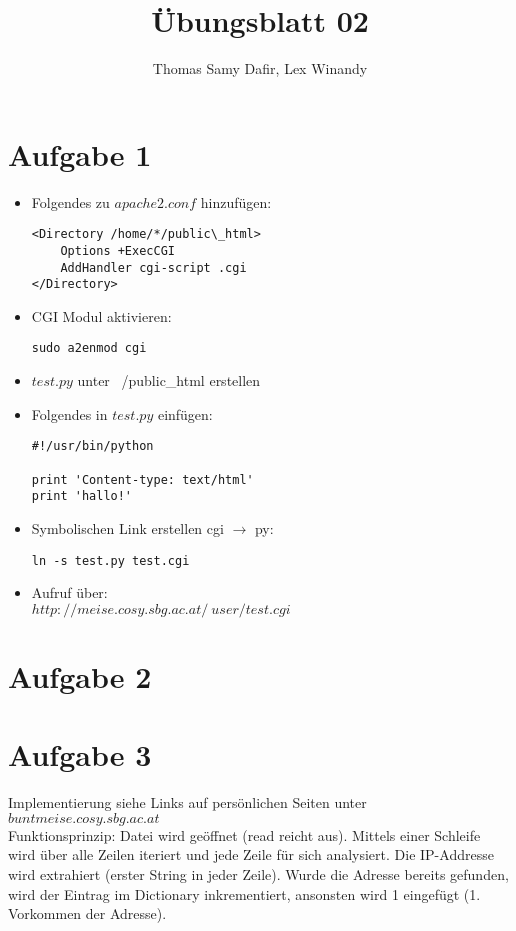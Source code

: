 \documentclass[12pt, a4paper]{report}
\title{Übungsblatt 02}
\author{Thomas Samy Dafir, Lex Winandy}
\date{}
\begin{document}
\maketitle

\section*{Aufgabe 1}
\begin{itemize}

\item Folgendes zu $apache2.conf$ hinzufügen:
\begin{verbatim}
<Directory /home/*/public\_html>
	Options +ExecCGI
	AddHandler cgi-script .cgi
</Directory>
\end{verbatim}
\item CGI Modul aktivieren:
\begin{verbatim}
sudo a2enmod cgi
\end{verbatim}

\item $test.py$ unter ~/public\_html erstellen\\

\item Folgendes in $test.py$ einfügen:
\begin{verbatim}
#!/usr/bin/python

print 'Content-type: text/html'
print 'hallo!'
\end{verbatim}

\item Symbolischen Link erstellen cgi $\rightarrow$ py:
\begin{verbatim}
ln -s test.py test.cgi
\end{verbatim}

\item Aufruf über:\\ $http://meise.cosy.sbg.ac.at/~user/test.cgi$
\end{itemize}


\section*{Aufgabe 2}

\section*{Aufgabe 3}

Implementierung siehe Links auf persönlichen Seiten unter $buntmeise.cosy.sbg.ac.at$\\
Funktionsprinzip: Datei wird geöffnet (read reicht aus). Mittels einer Schleife wird über alle Zeilen iteriert und jede Zeile
für sich analysiert. Die IP-Addresse wird extrahiert (erster String in jeder Zeile). Wurde die Adresse bereits gefunden, wird der Eintrag im Dictionary inkrementiert, ansonsten wird 1 eingefügt (1. Vorkommen der Adresse).
\end{document}
